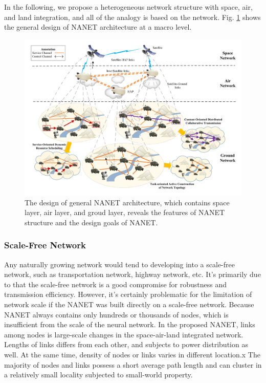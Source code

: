 \documentclass[journal,comsoc]{IEEEtran}
\begin{document}
			In the following, we propose a heterogeneous network structure with space, air, and land integration, and all of the analogy is based on the network.
			Fig. \ref{fig: sys_frame} shows the general design of NANET architecture at a macro level.
			\begin{figure}[htbp]
				\centering
				\includegraphics[width=\linewidth]{figures/Net_Arc.pdf}
				\caption{The design of general NANET architecture, which contains space layer, air layer, and groud layer, reveals the features of NANET structure and the design goals of NANET.}	
				\label{fig: sys_frame}
			\end{figure}
			\subsubsection{Scale-Free Network}
				Any naturally growing network would tend to developing into a scale-free network, such as transportation network, highway network, etc. 
				It's primarily due to that the scale-free network is a good compromise for robustness and transmission efficiency.
				However, it's certainly problematic for the limitation of network scale if the NANET was built directly on a scale-free network.
				Because NANET always contains only hundreds or thousands of nodes, which is insufficient from the scale of the neural network.
				In the proposed NANET, links among nodes is large-scale changes in the space-air-land integrated network.
				Lengths of links differs from each other, and subjects to power distribution as well. 
				At the same time, density of nodes or links varies in different location.x
				The majority of nodes and links possess a short average path length and can cluster in a relatively small locality subjected to small-world property.
				
\end{document}
